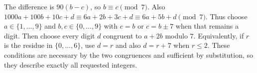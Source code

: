 The difference is $90(b-c)$, so $b\equiv c\pmod7$. Also $1000a+100b+10c+d\equiv6a+2b+3c+d\equiv6a+5b+d\pmod7$. Thus choose $a\in\{1,\ldots,9\}$ and $b,c\in\{0,\ldots,9\}$ with $c=b$ or $c=b\pm7$ when that remains a digit. Then choose every digit $d$ congruent to $a+2b$ modulo $7$. Equivalently, if $r$ is the residue in $\{0,\ldots,6\}$, use $d=r$ and also $d=r+7$ when $r\le2$. These conditions are necessary by the two congruences and sufficient by substitution, so they describe exactly all requested integers.
